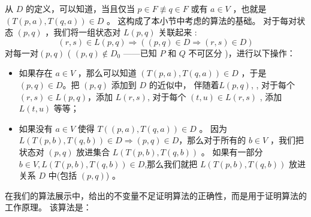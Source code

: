 从 $D$ 的定义，可以知道，当且仅当 $p \in F \not\equiv q \in F$ 或有 $a\in V$ ，也就是$(T(p,a),T(q,a)) \in D$ 。%
这构成了本小节中考虑的算法的基础。%
对于每对状态 $(p,q)$ ，我们将一组状态对 $L(p,q)$ 关联起来 :
$$ (r,s) \in L(p,q) \Rightarrow ((p,q) \in D \Rightarrow (r,s) \in D) $$
对每一对$(p,q)$ ( $ (p,q) \not\in D_0 $ ——已知 $P$ 和 $Q$ 不可区分 )，进行以下操作：

\begin{itemize}
    \item 如果存在 $a\in V$ ，那么可以知道 $ ( T(p,a), T(q,a) )  \in D $ ，于是 $ (p,q) \in D $。把 $( p,q )$ 添加到 $D$ 的近似中， 伴随着$ L(p,q) $, %
    , 对于每个 $ (r,s) \in L(p,q) $，添加 $ L(r,s) $, 对于每个 $ (t,u) \in L(r,s) $ , 添加 $ L(t,u) $ 等等；
    \item 如果没有 $a \in V$ 使得 $ T((p,a),T(q,a)) \in D $ 。 因为$ L( T(p,b),T (q,b) ) \in D \Rightarrow (p,q) \in D $，那么对于所有的 $ b\in V$ ，我们把状态对 $ (p,q) $ 放进集合 $ L( T(p,b),T (q,b) ) $ 。 如果有一部分 $ b \in V , L( T(p,b),T (q,b) ) \in D$,那么我们就把 $ L( T(p,b),T (q,b) )$ 放进关系 $D$ 中(包括 $ (p,q) $) 。%
\end{itemize}
在我们的算法展示中，给出的不变量不足证明算法的正确性，而是用于证明算法的工作原理。 该算法是：

